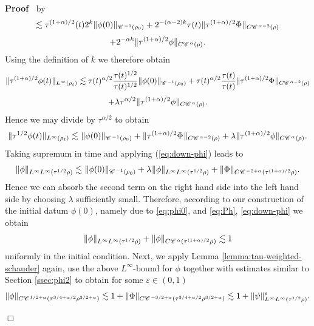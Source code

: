 \documentclass[a4paper,11pt]{article}
\newenvironment{proof}{\noindent\textbf{Proof\ }}{\hspace*{\fill}$\Box$\medskip}
\numberwithin{equation}{section}
\newcommand{\CC}{\mathscr{C} \hspace{.1em}}
\newcommand{\8}{\infty}
\begin{document}
\begin{proof}
  by
  \[ \lesssim \tau^{(1 + \alpha) / 2} (t) 2^{k} \| \phi (0)
     \|_{\CC^{- 1} (\rho_0)} + 2^{- (\alpha - 2) k} \tau (
     t)\| \tau^{(1 + \alpha) / 2} \Phi_{} \|_{C \CC^{\alpha - 2}
     (\rho)} \]
  \[ + 2^{- \alpha k} \| \tau^{(1 + \alpha) / 2} \phi \|_{C \CC^{\alpha}
     (\rho)} . \]
  Using the definition of $k$ we therefore obtain
  \[ \| \tau^{(1 + \alpha) / 2} \phi (t) \|_{L^{\infty} (\rho_t)} \lesssim
     \tau (t)^{\alpha / 2} \frac{\tau (t)^{1 / 2}}{\tau (t)^{1 / 2}} \| \phi
     (0) \|_{\CC^{ - 1} (\rho_0)} + \tau (t)^{\alpha / 2} \frac{\tau
     (t)}{ \tau (t)} \| \tau^{(1 + \alpha) / 2} \Phi_{} \|_{C
     \CC^{\alpha - 2} (\rho)} \]
  \[ + \lambda \tau^{\alpha / 2} \| \tau^{(1 + \alpha) / 2} \phi \|_{C
     \CC^{\alpha} (\rho)}. \]
Hence we may divide  by $\tau^{\alpha/2}$ to obtain
  \[ \| \tau^{1 / 2} \phi (t) \|_{L^{\infty} (\rho_t)} \lesssim_{} \| \phi (0)
     \|_{\CC^{ - 1} (\rho_0)} + \| \tau^{(1 + \alpha) / 2} \Phi_{} \|_{C
     \CC^{\alpha - 2} (\rho)} + \lambda \| \tau^{(1 + \alpha) / 2} \phi \|_{C
     \CC^{\alpha} (\rho)} . \]
  Taking supremum in time and applying (\ref{eq:down-phi}) leads to
  \[ \| \phi \|_{L^{\infty} L^{\infty} (\tau^{1 / 2} \rho)} \lesssim_{} \|
     \phi (0) \|_{\CC^{ - 1} (\rho_0)} + \lambda^{} \| \phi
     \|_{L^{\infty} L^{\infty} (\tau^{1 / 2} \rho)} + \| \Phi \|_{C \CC^{- 2 +
     \alpha} (\tau^{(1 + \alpha) / 2} \rho)}. \]
Hence we can absorb the second term on the right hand side into the left hand side by choosing $\lambda$ sufficiently small.
Therefore, according to our construction of the initial datum $\phi(0)$, namely due to \eqref{eq:phi0}, and \eqref{eq:Ph}, \eqref{eq:down-phi}   we obtain
  \[ \| \phi \|_{L^{\infty} L^{\infty} (\tau^{1 / 2} \rho)} + \| \phi \|_{C
     \CC^{\alpha} (\tau^{(1 + \alpha) / 2} \rho^{})} \lesssim 1\]
     uniformly in the initial condition.
  Next, we apply Lemma \ref{lemma:tau-weighted-schauder} again, use the above
  $L^{\infty}$-bound for $\phi$ together with estimates similar to Section
  \ref{ssec:phi2} to obtain for some $\varepsilon\in (0,1)$
  \begin{equation}\label{eq:ph-down}
   \| \phi \|_{C \CC^{1 / 2 + \alpha} (\tau^{3 / 4 + \alpha / 2} \rho^{3 / 2
     + \alpha})} \lesssim 1 + \| \Phi \|_{C \CC^{- 3 / 2 + \alpha} (\tau^{3 /
     4 + \alpha / 2} \rho^{3 / 2 + \alpha})} \lesssim 1 + \| \psi
     \|_{L^{\infty} L^{\infty} (\tau^{1 / 2} \rho)}^{\varepsilon} .
     \end{equation}



\end{proof}
\end{document}
